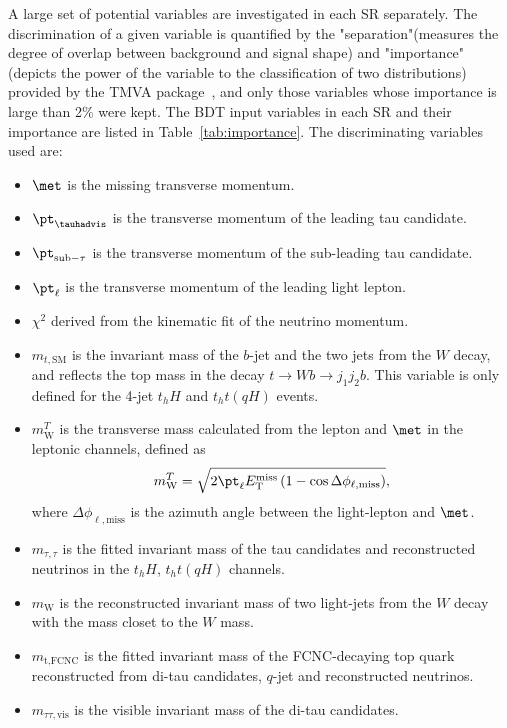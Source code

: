 A large set of potential variables are investigated in each SR separately. The discrimination of a given variable is quantified by the "separation"(measures the degree of overlap between background and signal shape) and "importance"(depicts the power of the variable to the classification of two distributions) provided by the TMVA package~\cite{Hocker:2007ht}, and only those variables whose importance is large than 2\% were kept.
The BDT input variables in each SR and their importance are listed in Table~\ref{tab:importance}. The discriminating variables used are:
\begin{itemize}
\item $\met$ is the missing transverse momentum.
\item ${\pt}_{\tauhadvis} $ is the transverse momentum of the leading tau candidate.
\item ${\pt}_{\text{sub}-\tau}$ is the transverse momentum of the sub-leading tau candidate.
\item ${\pt}_{\ell}$ is the transverse momentum of the leading light lepton.
\item $\chi^2$ derived from the kinematic fit of the neutrino momentum.
\item $m_{t,\text{SM}}$ is the invariant mass of the $b$-jet and the two jets from the $W$ decay, and reflects the top mass in the decay $t\to Wb \to j_1j_2b$. This variable is only defined for the 4-jet $t_hH$ and $t_ht(qH)$ events.
\item $m^{T}_{\text{W}}$ is the transverse mass calculated from the lepton and $\met$ in the leptonic channels, defined as
\begin{equation}
m^{T}_{\text{W}} = \sqrt{2 {\pt}_{\ell} E_{\text{T}}^{\text{miss}} \left(1-\cos\Delta\phi_{\ell,\text{miss}} \right)},  
\end{equation}
where $\Delta\phi_{\ell,\text{miss}}$ is the azimuth angle between the light-lepton and $\met$.  
\item $m_{\tau,\tau}$ is the fitted invariant mass of the tau candidates and reconstructed neutrinos in the $t_hH$, $t_ht(qH)$ channels. 
\item $m_{\text{W}}$ is the reconstructed invariant mass of two light-jets from the $W$ decay with the mass closet to the $W$ mass.
\item $m_{\text{t},\text{FCNC}}$ is the fitted invariant mass of the FCNC-decaying top quark reconstructed from di-tau candidates, $q$-jet and reconstructed neutrinos.
\item $m_{\tau\tau,\text{vis}}$ is the visible invariant mass of the di-tau candidates. %

\end{itemize}

